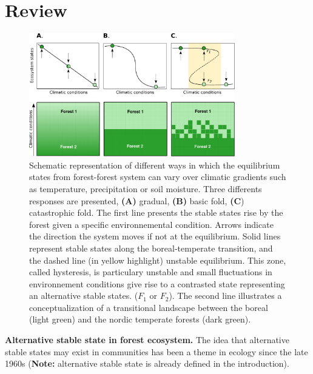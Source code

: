 \section{Review} 

\begin{figure}[t]
	\begin{center}
	\includegraphics[width=0.8\textwidth]{fig/states.pdf}
	\end{center}
	\caption{Schematic representation of different ways in which the equilibrium
	states from forest-forest system can vary over climatic gradients such as temperature, precipitation
	or soil moisture. Three differents responses are presented,
	\textbf{(A)} gradual, \textbf{(B)} basic fold, \textbf{(C}) catastrophic fold.
	The first line presents the stable states rise by the forest
	given a specific environnemental condition. Arrows indicate the
	direction the system moves if not at the equilibrium. 
	Solid lines represent stable states along the boreal-temperate
	transition, and the dashed line (in yellow highlight) unstable equilibrium. This zone,
	called hysteresis, is particulary unstable and small fluctuations in
	environnement conditions give rise to a contrasted state representing an
	alternative stable states. ($F_1$ or $F_2$). 
	The second line illustrates a conceptualization of a transitional landscape
	between the boreal (light green) and the nordic temperate forests (dark
	green).}
	\label{fig1}
\end{figure}



\textbf{Alternative stable state in forest ecosystem.} The idea that
alternative stable states may exist in communities has been a theme in ecology
since the late 1960s \cite{Scheffer2001,Society2014a,Holling1973}
(\textbf{Note:} alternative stable state is already defined in the
introduction).


